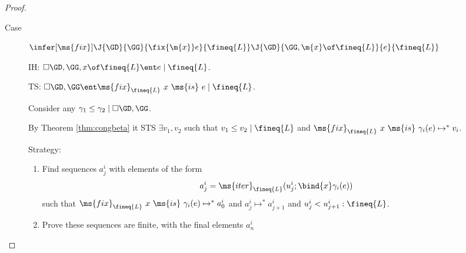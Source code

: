 \documentclass{article}
\newcommand{\tfix}[2]{\ms{fix}_{#1}~{#2}~\ms{is}~}
\newcommand{\iter}[4]{\ms{iter}_{#1}({#2}; \bind{#3}#4)}
\newcommand{\step}{\mapsto}
\newcommand{\steps}{\step^*}
\newcommand{\lr}[2]{#2\mathrel{|}#1}
\newcommand{\lrcx}[3]{#1 \ent \lr{#2}{#3}}
\begin{document}
\begin{proof}
\begin{description}
    \vspace{1em}
  \item[Case] $\infer[\ms{fix}]{\J{\GD}{\GG}{\fix{\m{x}} e}{\fineq{L}}}{
    \J{\GD}{\GG,\m{x}\of \fineq{L}}{e}{\fineq{L}}}$

    IH: $\lrcx{\cxdisc{\GD}, \GG, x \of \fineq{L}}{\fineq{L}}{e}$.

    TS: $\lrcx{\cxdisc{\GD}, \GG}{\fineq{L}}{\tfix{\fineq{L}}{x} e}$.

    Consider any $\lr{\cxdisc{\GD},\GG}{\gamma_1 \le \gamma_2}$.

    By Theorem \ref{thm:congbeta} it STS $\exists v_1,v_2$ such that
    $\lr{\fineq{L}}{v_1 \le v_2}$ and $\tfix{\fineq{L}}{x} \gamma_i(e) \steps
    v_i$.

    Strategy:
    \begin{enumerate}
    \item Find sequences $a^i_j$ with elements of the form \[ a^i_j =
      \iter{\fineq{L}}{u^i_j}{x}{\gamma_i(e)}
      \]
      such that $\tfix{\fineq{L}}{x} \gamma_i(e) \steps a^i_0$ and $a^i_j \steps
      a^i_{j+1}$ and $u^i_j < u^i_{j+1} : \fineq{L}$.

    \item Prove these sequences are finite, with the final elements $a^i_n$
    \end{enumerate}

    \TODO
  \end{description}
\end{proof}
\end{document}
